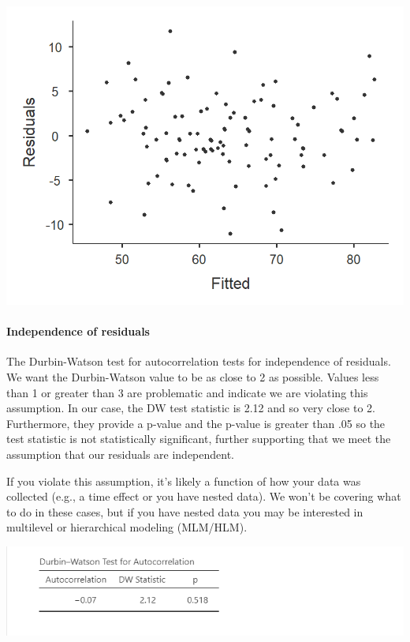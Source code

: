 \documentclass[
]{book}
\begin{document}
\includegraphics{images/13-regression/regression-residuals.png}

\hypertarget{independence-of-residuals}{%
\paragraph{Independence of residuals}\label{independence-of-residuals}}

The Durbin-Watson test for autocorrelation tests for independence of residuals. We want the Durbin-Watson value to be as close to 2 as possible. Values less than 1 or greater than 3 are problematic and indicate we are violating this assumption. In our case, the DW test statistic is 2.12 and so very close to 2. Furthermore, they provide a p-value and the p-value is greater than .05 so the test statistic is not statistically significant, further supporting that we meet the assumption that our residuals are independent.

If you violate this assumption, it's likely a function of how your data was collected (e.g., a time effect or you have nested data). We won't be covering what to do in these cases, but if you have nested data you may be interested in multilevel or hierarchical modeling (MLM/HLM).

\includegraphics{images/13-regression/regression-durbinwatson.png}
\end{document}
